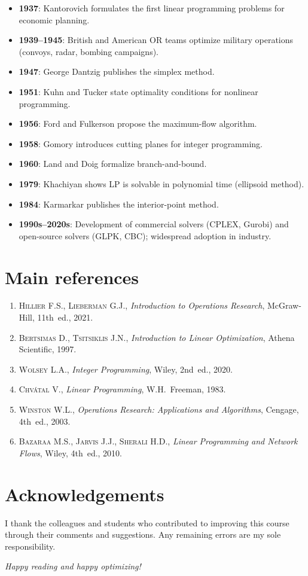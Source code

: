 \begin{itemize}
  \item \textbf{1937}: Kantorovich formulates the first linear programming
        problems for economic planning.
  \item \textbf{1939--1945}: British and American OR teams optimize military
        operations (convoys, radar, bombing campaigns).
  \item \textbf{1947}: George Dantzig publishes the simplex method.
  \item \textbf{1951}: Kuhn and Tucker state optimality conditions for
        nonlinear programming.
  \item \textbf{1956}: Ford and Fulkerson propose the maximum-flow algorithm.
  \item \textbf{1958}: Gomory introduces cutting planes for integer
        programming.
  \item \textbf{1960}: Land and Doig formalize branch-and-bound.
  \item \textbf{1979}: Khachiyan shows LP is solvable in polynomial time
        (ellipsoid method).
  \item \textbf{1984}: Karmarkar publishes the interior-point method.
  \item \textbf{1990s--2020s}: Development of commercial solvers (CPLEX,
        Gurobi) and open-source solvers (GLPK, CBC); widespread adoption in
        industry.
\end{itemize}

\section*{Main references}

\begin{enumerate}
  \item \textsc{Hillier} F.S., \textsc{Lieberman} G.J.,
        \textit{Introduction to Operations Research}, McGraw-Hill,
        11th~ed., 2021.
  \item \textsc{Bertsimas} D., \textsc{Tsitsiklis} J.N.,
        \textit{Introduction to Linear Optimization}, Athena Scientific, 1997.
  \item \textsc{Wolsey} L.A.,
        \textit{Integer Programming}, Wiley, 2nd~ed., 2020.
  \item \textsc{Chv\'atal} V.,
        \textit{Linear Programming}, W.H.~Freeman, 1983.
  \item \textsc{Winston} W.L.,
        \textit{Operations Research: Applications and Algorithms},
        Cengage, 4th~ed., 2003.
  \item \textsc{Bazaraa} M.S., \textsc{Jarvis} J.J., \textsc{Sherali} H.D.,
        \textit{Linear Programming and Network Flows}, Wiley, 4th~ed., 2010.
\end{enumerate}

\section*{Acknowledgements}

I thank the colleagues and students who contributed to improving this course
through their comments and suggestions.  Any remaining errors are my sole
responsibility.

\vfill
\begin{flushright}
\textit{Happy reading and happy optimizing!}
\end{flushright}
